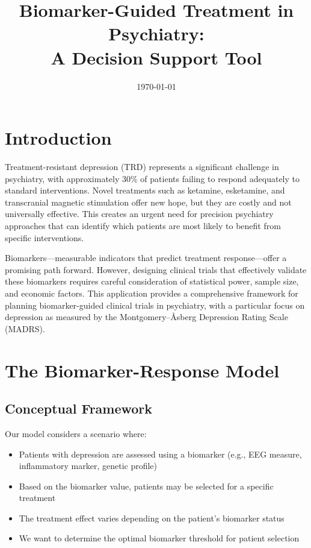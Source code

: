 \documentclass{article}
\title{Biomarker-Guided Treatment in Psychiatry: \\ A Decision Support Tool}
\author{}
\date{\today}
\begin{document}
\maketitle

\section{Introduction}

Treatment-resistant depression (TRD) represents a significant challenge in psychiatry, with approximately 30\% of patients failing to respond adequately to standard interventions. Novel treatments such as ketamine, esketamine, and transcranial magnetic stimulation offer new hope, but they are costly and not universally effective. This creates an urgent need for precision psychiatry approaches that can identify which patients are most likely to benefit from specific interventions.

Biomarkers—measurable indicators that predict treatment response—offer a promising path forward. However, designing clinical trials that effectively validate these biomarkers requires careful consideration of statistical power, sample size, and economic factors. This application provides a comprehensive framework for planning biomarker-guided clinical trials in psychiatry, with a particular focus on depression as measured by the Montgomery–Åsberg Depression Rating Scale (MADRS).

\section{The Biomarker-Response Model}

\subsection{Conceptual Framework}

Our model considers a scenario where:

\begin{itemize}
    \item Patients with depression are assessed using a biomarker (e.g., EEG measure, inflammatory marker, genetic profile)
    \item Based on the biomarker value, patients may be selected for a specific treatment
    \item The treatment effect varies depending on the patient's biomarker status
    \item We want to determine the optimal biomarker threshold for patient selection
\end{itemize}
\end{document}
